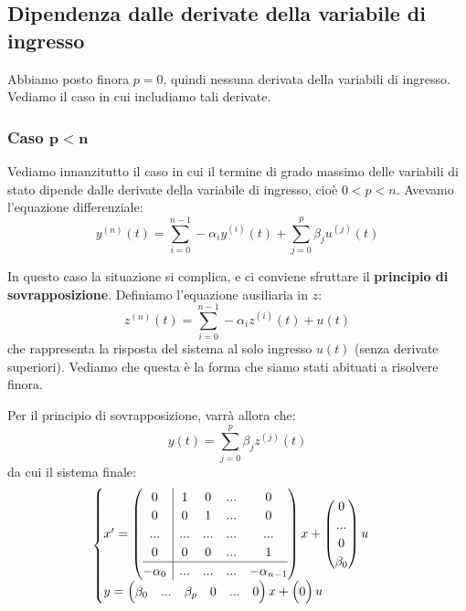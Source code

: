 \documentclass[a4paper,11pt]{article}
\begin{document}
\subsection{Dipendenza dalle derivate della variabile di ingresso}
Abbiamo posto finora $p = 0$, quindi nessuna derivata della variabili di ingresso.
Vediamo il caso in cui includiamo tali derivate.

\subsubsection{Caso $\mathbf{p < n}$}
Vediamo innanzitutto il caso in cui il termine di grado massimo delle variabili di stato dipende dalle derivate della variabile di ingresso, cioè $0 < p < n$.
Avevamo l'equazione differenziale:
$$
y^{(n)} (t) = \sum_{i=0}^{n-1} - \alpha_i y^{(i)}(t) + \sum_{j=0}^p \beta_j u^{(j)}(t)
$$

In questo caso la situazione si complica, e ci conviene sfruttare il \textbf{principio di sovrapposizione}.
Definiamo l'equazione ausiliaria in $z$:
$$
z^{(n)}(t) = \sum_{i = 0}^{n - 1} -\alpha_i z^{(i)}(t) + u(t)
$$
che rappresenta la risposta del sistema al solo ingresso $u(t)$ (senza derivate superiori).
Vediamo che questa è la forma che siamo stati abituati a risolvere finora.

Per il principio di sovrapposizione, varrà allora che:
$$
y(t) = \sum_{j = 0}^{p} \beta_j z^{(j)}(t)
$$
da cui il sistema finale:
\[
	\begin{cases}	
x' = \left(\begin{array}{@{}c | cccc@{}}
	0 & 1 & 0 & ... & 0 \\
	0 & 0 & 1 & ... & 0 \\
	... & ... & ... & ... & ... \\
	0 & 0 & 0 & ... & 1 \\
	\hline
	-\alpha_0 & ... & ... & ... & -\alpha_{n - 1}
\end{array}\right)
x + \begin{pmatrix}
0 \\
... \\
0 \\
\beta_0
\end{pmatrix} u \\ 
y = \begin{pmatrix}
	\beta_0 & ... & \beta_p & 0 & ... & 0
\end{pmatrix} x + \begin{pmatrix}
0
\end{pmatrix} u
	\end{cases}
\]
\end{document}
